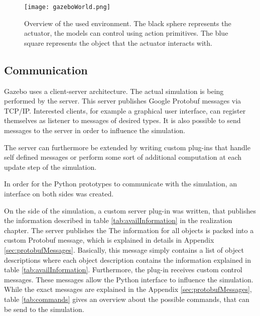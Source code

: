 \begin{figure} 
	\centering
	\texttt{[image: gazeboWorld.png]} 
	\caption{Overview of the used environment. The black sphere represents the actuator, the models can control using action primitives. The blue square represents the object that the actuator interacts with.}
	\label{fig:gazeboWorld}
\end{figure}


\subsection{Communication}
Gazebo uses a client-server architecture. The actual simulation is being performed by the server.
This server publishes Google Protobuf \cite{protobuf} messages via TCP/IP. Interested clients, for example a graphical user interface, can register themselves as listener to messages of desired types. 
It is also possible to send messages to the server in order to influence the simulation. 

The server can furthermore be extended by writing custom plug-ins that handle self defined messages or perform some sort of additional computation at each update step of the simulation. 

In order for the Python prototypes to communicate with the simulation, an interface on both sides was created.

On the side of the simulation, a custom server plug-in was written, that publishes the information described in table \ref{tab:availInformation} in the realization chapter. 
The server publishes the 
The information for all objects is packed into a custom Protobuf message, which is explained in details in Appendix \ref{sec:protobufMessages}. Basically, this message simply contains a list of object descriptions where each object description contains the information explained in table \ref{tab:availInformation}.
Furthermore, the plug-in receives custom control messages. These messages allow the Python interface to influence the simulation.
While the exact messages are explained in the Appendix \ref{sec:protobufMessages}, table \ref{tab:commands} gives an overview about the possible commands, that can be send to the simulation.

